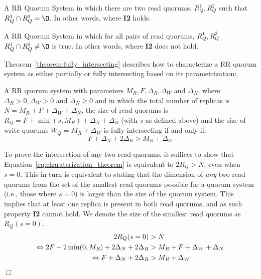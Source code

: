 \begin{defin} 
    A \ac{RR} Quorum System in which there are two read
    quorums, $R_Q^1, R_Q^2$ such that $R_Q^1 \cap R_Q^2 =
    \O$. In other words, where \textbf{I2} holds.
\end{defin}

\begin{defin} 
    A \ac{RR} Quorum System in which for all pairs of read
    quorums, $R_Q^1, R_Q^2$ $R_Q^1 \cap R_Q^2 \neq
    \O$ is true. In other words, where \textbf{I2} does not
    hold.
\end{defin}

Theorem~\ref{theorem:fully_intersecting} describes how to
characterize a \ac{RR} quorum system as either partially or
fully intersecting based on its parametrization:

\begin{theorem} \label{theorem:fully_intersecting}
    A \ac{RR} quorum system with parameters $M_R, F,
    \Delta_R, \Delta_W$ and $\Delta_N$, where $\Delta_R > 0,
    \Delta_W > 0$ and $\Delta_N \geq 0$ and in which the
    total number of replicas is $N = M_R + F + \Delta_W +
    \Delta_N$, the size of read quorums is $R_Q = F + \min(s,
    M_R) + \Delta_N + \Delta_R$ (with $s$ as defined above)
    and the size of write quorums $W_Q = M_R + \Delta_W$ is
    fully intersecting if and only if:
    \begin{equation}\label{eq:charaterization_theorem}
        F + \Delta_N + 2 \Delta_R > M_R + \Delta_W
    \end{equation}
\end{theorem}
\begin{dem}
    To prove the intersection of any two read quorums, it
    suffices to show that
    Equation~\ref{eq:charaterization_theorem} is equivalent to $2
    R_Q > N$, even when $s = 0$. This in turn is equivalent to
    stating that the dimension of \emph{any} two read quorums
    from the set of the smallest read quorums possible for a
    quorum system (i.e., those where $s = 0$) is larger than the
    size of the quorum system. This implies that at least one
    replica is present in both read quorums, and as such property
    \textbf{I2} cannot hold. We denote the size of the smallest
    read quorums as $R_Q(s = 0)$.
    \begin{align*}
        2 R_Q (s = 0) &> N  \\
        \Leftrightarrow 2F + 2\min(0, M_R) + 2\Delta_N + 2\Delta_R &> M_R + F + \Delta_W + \Delta_N  \\
        \Leftrightarrow F + \Delta_N + 2\Delta_R &> M_R + \Delta_W \\
    \end{align*}
    \hfill\ensuremath{\Box}\vspace{2em}
\end{dem}

